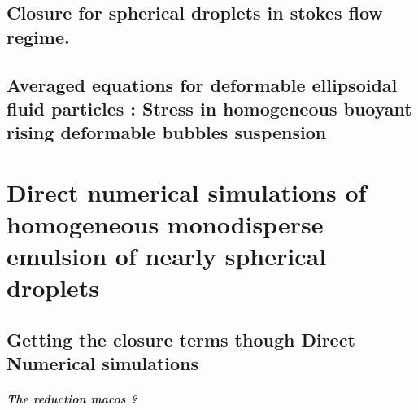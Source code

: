 \documentclass[12pt,a4paper,onehalfspacing]{My_book}
\begin{document}






\chapter{Closure for spherical droplets in stokes flow regime. }
\label{chap:daniel2}
\localtableofcontents






\chapter{Averaged equations for deformable ellipsoidal fluid particles : Stress in homogeneous buoyant rising deformable bubbles suspension }
\localtableofcontents







   

\part{Direct numerical simulations of homogeneous monodisperse emulsion of nearly spherical droplets}

\chapter{Getting the closure terms though Direct Numerical simulations}
\label{chap:DNS}
\localtableofcontents








\subsubsection{The reduction macos ? }
\end{document}
